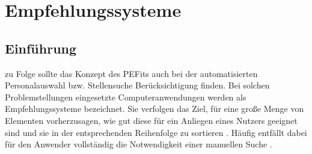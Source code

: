 
\chapter{Empfehlungssysteme}
\label{ch:empfehlungssysteme}

\section{Einführung}
\label{ch:empfehlungssysteme:einfuehrung}
\textcite[S. 1ff.]{malinowski:2006} zu Folge sollte das Konzept des \acp{PEFit} auch bei der automatisierten Personalauswahl bzw. Stellensuche Berücksichtigung finden. Bei solchen Problemstellungen eingesetzte Computeranwendungen werden als Empfehlungssysteme bezeichnet. Sie verfolgen das Ziel, für eine große Menge von Elementen vorherzusagen, wie gut diese für ein Anliegen eines Nutzers geeignet sind und sie in der entsprechenden Reihenfolge zu sortieren \cite[S. 3]{recommenderSystems:2016}. Häufig entfällt dabei für den Anwender vollständig die Notwendigkeit einer manuellen Suche \cite[S. 1]{comibingCareer:2013}. 

